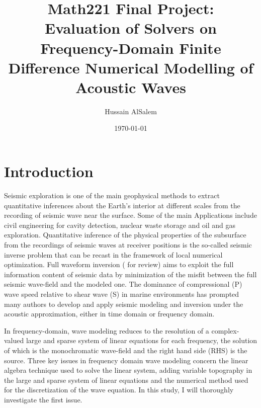 \documentclass[12pt]{article}
\begin{document}
\title{Math221 Final Project:\\ Evaluation of Solvers on Frequency-Domain Finite Difference Numerical Modelling of Acoustic Waves }
\date{\today}
\author{Hussain AlSalem \vspace{10mm}}
\maketitle

\section{Introduction}
Seismic exploration is one of the main geophysical methods to extract quantitative inferences about the Earth's interior at different scales from the recording of seismic wave near the surface. Some of the main Applications include civil engineering for cavity detection, nuclear waste storage and oil and gas exploration. Quantitative inference of the physical properties of the subsurface from the recordings of seismic waves at receiver positions is the so-called seismic inverse problem that can be recast in the framework of local numerical optimization. Full waveform inversion (\citet{virieux2009overview} for review) aims to exploit the full information content of seismic data by minimization of the misfit between the full seismic wave-field and the modeled one. The dominance of compressional (P) wave speed relative to shear wave (S) in marine environments has prompted many authors to develop and apply seismic modeling and inversion under the acoustic approximation, either in time domain or frequency domain.

In frequency-domain, wave modeling reduces to the resolution of a complex-valued large and sparse system of linear equations for each frequency, the solution of which is the monochromatic wave-field and the right hand side (RHS) is the source. Three key issues in frequency domain wave modeling concern the linear algebra technique used to solve the linear system, adding variable topography in the large and sparse system of linear equations and the numerical method used for the discretization of the wave equation. In this study, I will thoroughly investigate the first issue.
\end{document}
